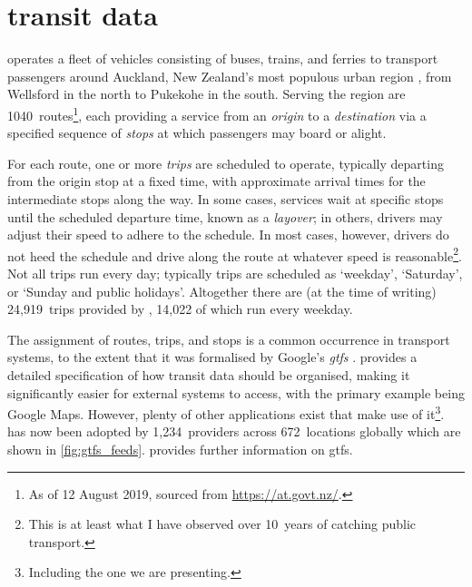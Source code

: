 \chapter{\Rt{} transit data}
\label{cha:data}



\AT{} operates a fleet of vehicles consisting of buses, trains, and ferries to transport passengers around Auckland, New Zealand's most populous urban region \citep{StatsNZ_2019}, from Wellsford in the north to Pukekohe in the south. Serving the region are 1040~routes\footnote{As of 12 August 2019, sourced from \url{https://at.govt.nz/}.}, each providing a service from an \emph{origin} to a \emph{destination} via a specified sequence of \emph{stops} at which passengers may board or alight.


For each route, one or more \emph{trips} are scheduled to operate, typically departing from the origin stop at a fixed time, with approximate arrival times for the intermediate stops along the way. In some cases, services wait at specific stops until the scheduled departure time, known as a \emph{layover}; in others, drivers may adjust their speed to adhere to the schedule. In most cases, however, drivers do not heed the schedule and drive along the route at whatever speed is reasonable\footnote{This is at least what I have observed over 10~years of catching public transport.}. Not all trips run every day; typically trips are scheduled as `weekday', `Saturday', or `Sunday and public holidays'. Altogether there are (at the time of writing) 24,919~trips provided by \AT{}, 14,022 of which run every weekday.


The assignment of routes, trips, and stops is a common occurrence in transport systems, to the extent that it was formalised by Google's \emph{\acrfull{gtfs}} \citep {GoogleDevelopers_2006}. \GTFS{} provides a detailed specification of how transit data should be organised, making it significantly easier for external systems to access, with the primary example being Google Maps. However, plenty of other applications exist that make use of it\footnote{Including the one we are presenting.}. \GTFS{} has now been adopted by 1,234~providers across 672~locations globally which are shown in \cref{fig:gtfs_feeds}.  provides further information on \gls{gtfs}.

